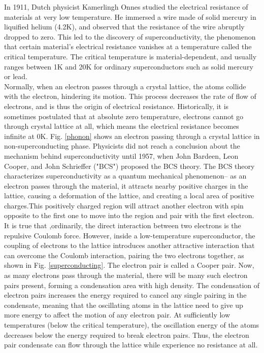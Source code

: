\documentclass[prb,preprint]{revtex4-1}
\begin{document}
In 1911, Dutch physicist Kamerlingh Onnes studied the electrical resistance of materials at very low temperature. He immersed a wire made of solid mercury in liquified helium (4.2K), and observed that the resistance of the wire abruptly dropped to zero. This led to the discovery of superconductivity, the phenomenon that certain material's electrical resistance vanishes at a temperature called the critical temperature. The critical temperature is material-dependent, and usually ranges between 1K and 20K for ordinary superconductors such as solid mercury or lead.\\

Normally, when an electron passes through a crystal lattice, the atoms collide with the electron, hindering its motion. This process decreases the rate of flow of electrons, and is thus the origin of electrical resistance. Historically, it is sometimes postulated that at absolute zero temperature, electrons cannot go through crystal lattice at all, which means the electrical resistance becomes infinite at 0K. Fig. \ref{phonon} shows an electron passing through a crystal lattice in non-superconducting phase. Physicists did not reach a conclusion about the mechanism behind superconductivity until 1957, when John Bardeen, Leon Cooper, and John Schrieffer ("BCS") proposed the BCS theory. The BCS theory characterizes superconductivity as a quantum mechanical phenomenon-- as an electron passes through the material, it attracts nearby positive charges in the lattice, causing a deformation of the lattice, and creating a local area of positive charges.This positively charged region will attract another electron with spin opposite to the first one to move into the region and pair with the first electron. It is true that ,ordinarily, the direct interaction between two electrons is the repulsive Coulomb force. However, inside a low-temperature superconductor, the coupling of electrons to the lattice introduces another attractive interaction that can overcome the Coulomb interaction, pairing the two electrons together, as shown in Fig. \ref{superconducting}. The electron pair is called a Cooper pair. Now, as many electrons pass through the material, there will be many such electron pairs present, forming a condensation area with high density. The condensation of electron pairs increases the energy required to cancel any single pairing in the condensate, meaning that the oscillating atoms in the lattice need to give up more energy to affect the motion of any electron pair. At sufficiently low temperatures (below the critical temperature), the oscillation energy of the atoms decreases below the energy required to break electron pairs. Thus, the electron pair condensate can flow through the lattice while experience no resistance at all.\\
\end{document}
